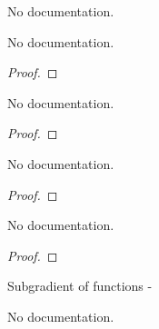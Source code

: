 \begin{definition}\label{Epi}
        \leanok
                No documentation.
    \end{definition}

\begin{lemma}\label{EpigraphInterior_existence}
        \leanok
                No documentation.
    \end{lemma}

\begin{proof}
    \leanok
\end{proof}

\begin{lemma}\label{mem_epi_frontier}
        \leanok
                No documentation.
    \end{lemma}

\begin{proof}
    \leanok
\end{proof}

\begin{theorem}\label{Banach_SubderivWithinAt.Nonempty}
        \leanok
                No documentation.
    \end{theorem}

\begin{proof}
    \leanok
\end{proof}

\begin{theorem}\label{Quasiconvex_first_order_condition_right}
        \leanok
                No documentation.
    \end{theorem}

\begin{proof}
    \leanok
\end{proof}

\begin{definition}\label{HasSubgradientAt}
        \leanok
                Subgradient of functions -
    \end{definition}

\begin{definition}\label{HasSubgradientWithinAt}
        \leanok
                No documentation.
    \end{definition}

